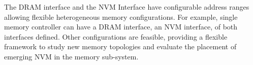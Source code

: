 The DRAM interface and the NVM Interface have configurable address ranges allowing flexible heterogeneous memory configurations.
For example, single memory controller can have a DRAM interface, an NVM interface, of both interfaces defined.
Other configurations are feasible, providing a flexible framework to study new memory topologies and evaluate the placement of emerging NVM in the memory sub-system.
